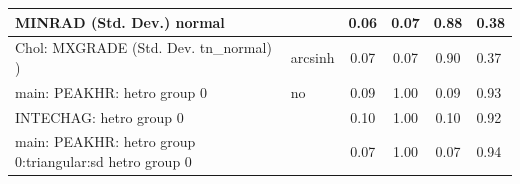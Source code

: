 \begin{table}
\begin{center}
\begin{tabular}{|l|l|c|c|c|l|}
			\hline
			MINRAD (Std. Dev.) normal &  & 0.06 & 0.07 & 0.88 & 0.38 \\
			\hline
			 Chol: MXGRADE (Std. Dev. tn_normal) ) & arcsinh & 0.07 & 0.07 & 0.90 & 0.37 \\
			\hline
			main: PEAKHR: hetro group 0 & no & 0.09 & 1.00 & 0.09 & 0.93 \\
			\hline
			INTECHAG: hetro group 0 &  & 0.10 & 1.00 & 0.10 & 0.92 \\
			\hline
			main: PEAKHR: hetro group 0:triangular:sd  hetro group 0 &  & 0.07 & 1.00 & 0.07 & 0.94 \\
			\hline
		\end{tabular}
	\end{center}
\end{table}